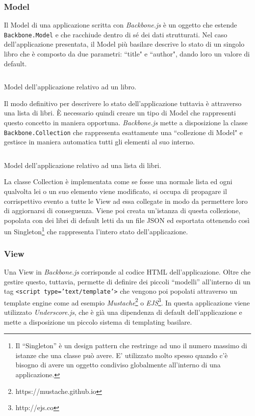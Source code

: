 \subsubsection{Model}
Il Model di una applicazione scritta con \textit{Backbone.js} è un oggetto che estende \texttt{Backbone.Model} e che racchiude dentro di sé dei dati strutturati. Nel caso dell'applicazione presentata, il Model più basilare descrive lo stato di un singolo libro che è composto da due parametri: “title" e “author", dando loro un valore di default.

\begin{listing}[ht]
\inputminted{Javascript}{sources/applicationMVCBookModel.js}
\caption{Model dell'applicazione relativo ad un libro.} 
\label{applicationMVCModel} 
\vspace*{0.5cm} 
\end{listing}

\noindent
Il modo definitivo per descrivere lo stato dell'applicazione tuttavia è attraverso una lista di libri. È necessario quindi creare un tipo di Model che rappresenti questo concetto in maniera opportuna. \textit{Backbone.js} mette a disposizione la classe \texttt{Backbone.Collection} che rappresenta esattamente una “collezione di Model" e gestisce in maniera automatica tutti gli elementi al suo interno.

\begin{listing}[ht]
\inputminted{Javascript}{sources/applicationMVCBookshelfCollection.js}
\caption{Model dell'applicazione relativo ad una lista di libri.} 
\label{applicationMVCBookCollection} 
\end{listing}

\noindent
La classe Collection è implementata come se fosse una normale lista ed ogni qualvolta lei o un suo elemento viene modificato, si occupa di propagare il corrispettivo evento a tutte le View ad essa collegate in modo da permettere loro di aggiornarsi di conseguenza.
Viene poi creata un'istanza di questa collezione, popolata con dei libri di default letti da un file JSON ed esportata ottenendo così un Singleton\footnote{Il “Singleton” è un design pattern che restringe ad uno il numero massimo di istanze che una classe può avere. E' utilizzato molto spesso quando c'è bisogno di avere un oggetto condiviso globalmente all'interno di una applicazione.} che rappresenta l'intero stato dell'applicazione.

\subsubsection{View}
Una View in \textit{Backbone.js} corrisponde al codice HTML dell'applicazione. Oltre che gestire questo, tuttavia, permette di definire dei piccoli “modelli” all'interno di un tag \texttt{<script type='text/template'>} che vengono poi popolati attraverso un template engine come ad esempio \textit{Mustache}\footnote{https://mustache.github.io} o \textit{EJS}\footnote{http://ejs.co}. In questa applicazione viene utilizzato \textit{Underscore.js}, che è già una dipendenza di default dell'applicazione e mette a disposizione un piccolo sistema di templating basilare.

